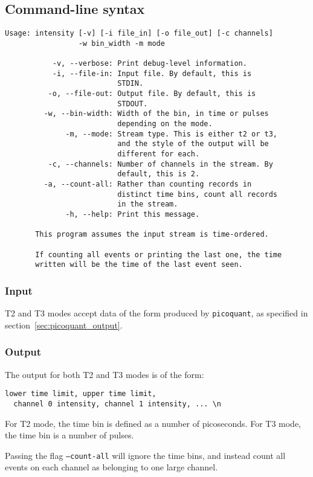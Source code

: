 \documentclass{article}
\newcommand{\picoquant}{\texttt{picoquant}}
\begin{document}
\subsection{Command-line syntax}
\begin{verbatim}
Usage: intensity [-v] [-i file_in] [-o file_out] [-c channels]
                 -w bin_width -m mode

           -v, --verbose: Print debug-level information.
           -i, --file-in: Input file. By default, this is
                          STDIN.
          -o, --file-out: Output file. By default, this is
                          STDOUT.
         -w, --bin-width: Width of the bin, in time or pulses
                          depending on the mode.
              -m, --mode: Stream type. This is either t2 or t3,
                          and the style of the output will be
                          different for each.
          -c, --channels: Number of channels in the stream. By
                          default, this is 2.
         -a, --count-all: Rather than counting records in 
                          distinct time bins, count all records 
                          in the stream.
              -h, --help: Print this message.

       This program assumes the input stream is time-ordered.
       
       If counting all events or printing the last one, the time
       written will be the time of the last event seen.
\end{verbatim}

\subsubsection{Input}
T2 and T3 modes accept data of the form produced by \picoquant, as specified in section~\ref{sec:picoquant_output}.

\subsubsection{Output}
The output for both T2 and T3 modes is of the form:
\begin{verbatim}
lower time limit, upper time limit, 
  channel 0 intensity, channel 1 intensity, ... \n
\end{verbatim}
For T2 mode, the time bin is defined as a number of picoseconds. For T3 mode, the time bin is a number of pulses.

Passing the flag \texttt{--count-all} will ignore the time bins, and instead count all events on each channel as belonging to one large channel. 
\end{document}
